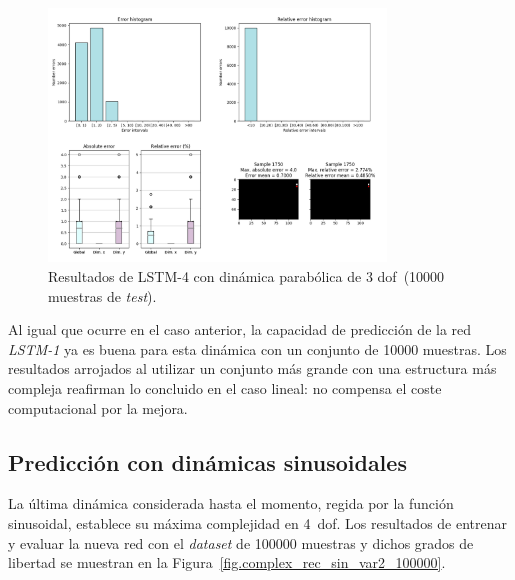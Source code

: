 \begin{figure}[H]
		\begin{center}
			\includegraphics[width=0.8\textwidth]{ figures/test_mod/REC/complex/parab_var1_100000.png}
			\caption{Resultados de LSTM-4 con dinámica parabólica de 3 \acrshort{dof}~(10000 muestras de \textit{test}).} 
			\label{fig.complex_rec_parab_var1_100000}
		\end{center}
\end{figure}
\vspace{-10pt}

Al igual que ocurre en el caso anterior, la capacidad de predicción de la red \textit{LSTM-1} ya es buena para esta dinámica con un conjunto de 10000 muestras. Los resultados arrojados al utilizar un conjunto más grande con una estructura más compleja reafirman lo concluido en el caso lineal: no compensa el coste computacional por la mejora.

\subsection{Predicción con dinámicas sinusoidales}
La última dinámica considerada hasta el momento, regida por la función sinusoidal, establece su máxima complejidad en 4~\acrshort{dof}. Los resultados de entrenar y evaluar la nueva red con el \textit{dataset} de 100000 muestras y dichos grados de libertad se muestran en la Figura~\ref{fig.complex_rec_sin_var2_100000}.


